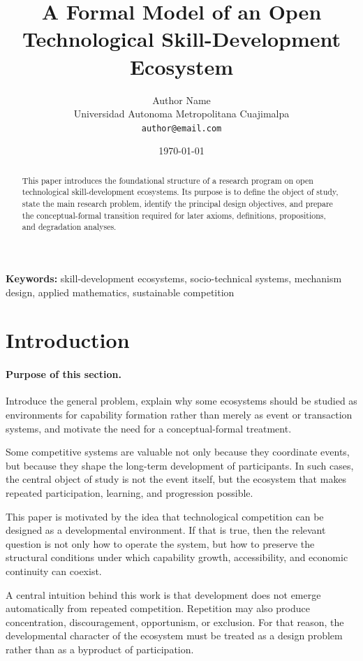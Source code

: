 \documentclass[11pt]{article}
\title{A Formal Model of an Open Technological Skill-Development Ecosystem}
\author{
  Author Name \\
  Universidad Autonoma Metropolitana Cuajimalpa \\
  \texttt{author@email.com}
}
\date{\today}
\begin{document}
\maketitle

\begin{abstract}
This paper introduces the foundational structure of a research program on open technological skill-development ecosystems. Its purpose is to define the object of study, state the main research problem, identify the principal design objectives, and prepare the conceptual-formal transition required for later axioms, definitions, propositions, and degradation analyses.
\end{abstract}

\noindent\textbf{Keywords:}
skill-development ecosystems, socio-technical systems, mechanism design, applied mathematics, sustainable competition

\section{Introduction}

\paragraph{Purpose of this section.}
Introduce the general problem, explain why some ecosystems should be studied as environments for capability formation rather than merely as event or transaction systems, and motivate the need for a conceptual-formal treatment.

Some competitive systems are valuable not only because they coordinate events, but because they shape the long-term development of participants. In such cases, the central object of study is not the event itself, but the ecosystem that makes repeated participation, learning, and progression possible.

This paper is motivated by the idea that technological competition can be designed as a developmental environment. If that is true, then the relevant question is not only how to operate the system, but how to preserve the structural conditions under which capability growth, accessibility, and economic continuity can coexist.

A central intuition behind this work is that development does not emerge automatically from repeated competition. Repetition may also produce concentration, discouragement, opportunism, or exclusion. For that reason, the developmental character of the ecosystem must be treated as a design problem rather than as a byproduct of participation.
\end{document}

